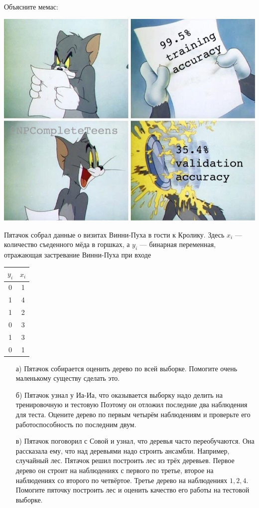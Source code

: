 \documentclass[12pt, a4paper, oneside]{article}
\theoremstyle{plain} %
\theoremstyle{definition}
\begin{document}
\begin{problem}{}
Объясните мемас: 

\begin{center}
	\includegraphics[scale=0.3]{memes2.jpg}
\end{center}
\end{problem}

\begin{problem}{}
Пятачок собрал данные о визитах Винни-Пуха в гости к Кролику. Здесь $x_i$ --- количество съеденного мёда в горшках, а $y_i$  --- бинарная переменная, отражающая застревание Винни-Пуха при входе 

\begin{center}
	\begin{tabular}{c|c}
		$y_i$ & $x_i$ \\
		\hline
		0  & 1 \\
		1 & 4\\
		1 & 2\\
		0 & 3 \\
		1 & 3 \\
		0 & 1
	\end{tabular}
\end{center}

\begin{enumerate}
	\item[а)] Пятачок собирается оценить дерево по всей выборке.  Помогите очень маленькому существу сделать это. 
	\item[б)] Пятачок узнал у Иа-Иа, что оказывается выборку надо делить на тренировочную и тестовую Поэтому он отложил последние два наблюдения для теста. Оцените дерево по первым четырём наблюдениям и проверьте его работоспособность по последним двум. 
	\item[в)]  Пятачок поговорил с Совой и узнал, что деревья часто переобучаются. Она рассказала ему, что над деревьями надо строить ансамбли. Например, случайный лес. Пятачок решил построить лес из трёх деревьев. Первое дерево он строит на наблюдениях с первого по третье, второе на наблюдениях со второго по четвёртое.  Третье дерево на наблюдениях $1,2,4$. Помогите пяточку построить лес и оценить качество его работы на тестовой выборке. 
\end{enumerate}
\end{problem}
\end{document}
